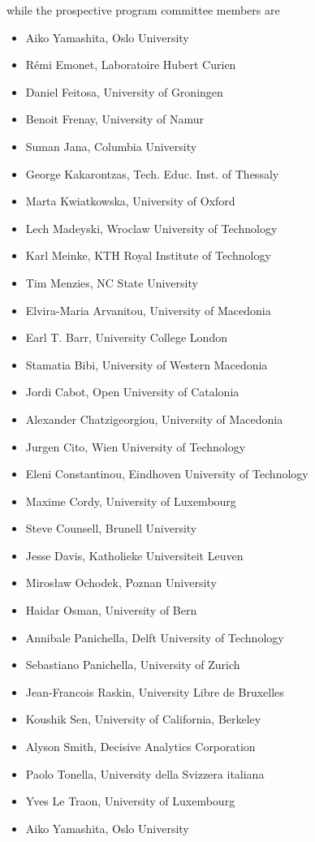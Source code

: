 	while the prospective program committee members are

\begin{itemize}[itemsep=0.5em]
	
	\item Aiko Yamashita, Oslo University
	\item Rémi Emonet, Laboratoire Hubert Curien 
	\item Daniel Feitosa, University of Groningen 
	\item Benoit Frenay, University of Namur 
	\item Suman Jana, Columbia University
	\item George Kakarontzas, Tech. Educ. Inst. of Thessaly
	\item Marta Kwiatkowska, University of Oxford
	\item Lech Madeyski, Wroclaw University of Technology
	\item Karl Meinke, KTH Royal Institute of Technology
	\item Tim Menzies, NC State University
	\item Elvira-Maria Arvanitou, University of Macedonia 
	\item Earl T. Barr, University College London 
	\item Stamatia Bibi, University of Western Macedonia 
	\item Jordi Cabot, Open University of Catalonia 
	\item Alexander Chatzigeorgiou, University of Macedonia 
	\item Jurgen Cito, Wien University of Technology 
	\item Eleni Constantinou, Eindhoven University of Technology 
	\item Maxime Cordy, University of Luxembourg 
	\item Steve Counsell, Brunell University 
	\item Jesse Davis, Katholieke Universiteit Leuven 
	\item Mirosław Ochodek, Poznan University
	\item Haidar Osman, University of Bern
	\item Annibale Panichella, Delft University of Technology
	\item Sebastiano Panichella, University of Zurich
	\item Jean-Francois Raskin, University Libre de Bruxelles
	\item Koushik Sen, University of California, Berkeley
	\item Alyson Smith, Decisive Analytics Corporation
	\item Paolo Tonella, University della Svizzera italiana
	\item Yves Le Traon, University of Luxembourg
	\item Aiko Yamashita, Oslo University

\end{itemize}
